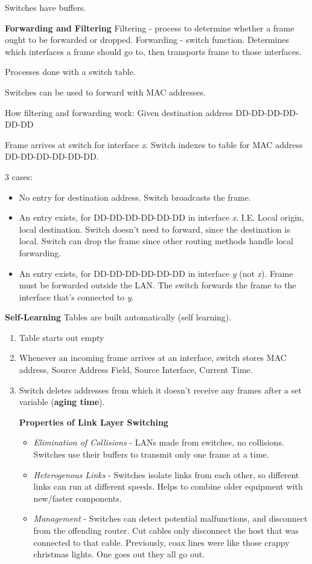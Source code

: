 \documentclass[11pt]{article}
\begin{document}
Switches have buffers.

\textbf{Forwarding and Filtering}
Filtering - process to determine whether a frame ought to be forwarded or dropped.
Forwarding - switch function. Determines which interfaces a frame should go to, then transports frame to those interfaces.

Processes done with a switch table.

Switches can be used to forward with MAC addresses.

How filtering and forwarding work:
Given destination address DD-DD-DD-DD-DD-DD

Frame arrives at switch for interface \emph{x}.
Switch indexes to table for MAC address DD-DD-DD-DD-DD-DD.

3 cases:
\begin{itemize}
\item No entry for destination address. Switch broadcasts the frame.
\item An entry exists, for DD-DD-DD-DD-DD-DD in interface \emph{x}. I.E. Local origin, local destination. Switch doesn't need to forward, since the destination is local. Switch can drop the frame since other routing methods handle local forwarding.
\item An entry exists, for DD-DD-DD-DD-DD-DD in interface \emph{y} (not \emph{x}). Frame must be forwarded outside the LAN. The switch forwards the frame to the interface that's connected to \emph{y}.
\end{itemize}


\textbf{Self-Learning}
Tables are built automatically (self learning).
\begin{enumerate}
\item Table starts out empty
\item Whenever an incoming frame arrives at an interface, switch stores MAC address, Source Address Field, Source Interface, Current Time.
\item Switch deletes addresses from which it doesn't receive any frames after a set variable (\textbf{aging time}).

\textbf{Properties of Link Layer Switching}
\begin{itemize}
\item \emph{Elimination of Collisions} - LANs made from switches, no collisions. Switches use their buffers to transmit only one frame at a time.

\item \emph{Heterogenous Links} - Switches isolate links from each other, so different links can run at different speeds. Helps to combine older equipment with new/faster components.

\item \emph{Management} - Switches can detect potential malfunctions, and disconnect from the offending router. Cut cables only disconnect the host that was connected to that cable. Previously, coax lines were like those crappy christmas lights. One goes out they all go out.
\end{itemize}
\end{enumerate}
\end{document}
